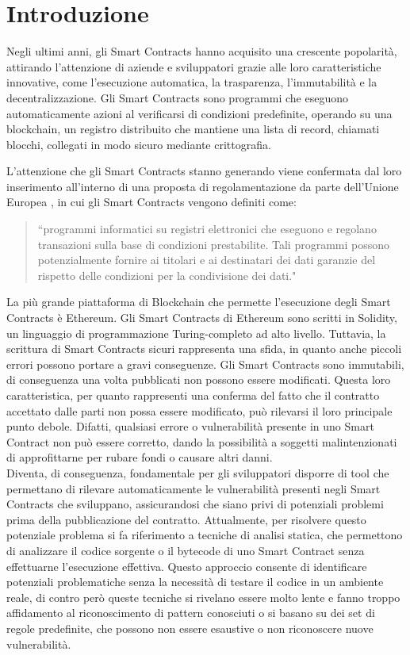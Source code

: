 \documentclass[../../Thesis.tex]{subfiles}
\begin{document}
\chapter{Introduzione}
Negli ultimi anni, gli Smart Contracts hanno acquisito una crescente popolarit\`a, attirando l'attenzione di aziende e sviluppatori grazie alle loro caratteristiche innovative, come l'esecuzione automatica, la trasparenza, l'immutabilit\`a e la decentralizzazione. Gli Smart Contracts sono programmi che eseguono automaticamente azioni al verificarsi di condizioni predefinite, operando su una blockchain, un registro distribuito che mantiene una lista di record, chiamati blocchi, collegati in modo sicuro mediante crittografia.

L'attenzione che gli Smart Contracts stanno generando viene confermata dal loro inserimento all'interno di una proposta di regolamentazione da parte dell'Unione Europea \cite{DataAct}, in cui gli Smart Contracts vengono definiti come: 
\begin{quotation}
    ``programmi informatici su registri elettronici che eseguono e regolano transazioni sulla base di condizioni prestabilite. Tali programmi possono potenzialmente fornire ai titolari e ai destinatari dei dati garanzie del rispetto delle condizioni per la condivisione dei dati."
\end{quotation}


La pi\`u grande piattaforma di Blockchain che permette l'esecuzione degli Smart Contracts \`e Ethereum. Gli Smart Contracts di Ethereum sono scritti in Solidity, un linguaggio di programmazione Turing-completo ad alto livello. Tuttavia, la scrittura di Smart Contracts sicuri rappresenta una sfida, in quanto anche piccoli errori possono portare a gravi conseguenze. Gli Smart Contracts sono immutabili, di conseguenza una volta pubblicati non possono essere modificati. Questa loro caratteristica, per quanto rappresenti una conferma del fatto che il contratto accettato dalle parti non possa essere modificato, pu\`o rilevarsi il loro principale punto debole. Difatti, qualsiasi errore o vulnerabilit\`a presente in uno Smart Contract non pu\`o essere corretto, dando la possibilit\`a a soggetti malintenzionati di approfittarne per rubare fondi o causare altri danni.\\

Diventa, di conseguenza, fondamentale per gli sviluppatori disporre di tool che permettano di rilevare automaticamente le vulnerabilit\`a presenti negli Smart Contracts che sviluppano, assicurandosi che siano privi di potenziali problemi prima della pubblicazione del contratto. Attualmente, per risolvere questo potenziale problema si fa riferimento a tecniche di analisi statica, che permettono di analizzare il codice sorgente o il bytecode di uno Smart Contract senza effettuarne l'esecuzione effettiva. Questo approccio consente di identificare potenziali problematiche senza la necessit\`a di testare il codice in un ambiente reale, di contro per\`o queste tecniche si rivelano essere molto lente e fanno troppo affidamento al riconoscimento di pattern conosciuti o si basano su dei set di regole predefinite, che possono non essere esaustive o non riconoscere nuove vulnerabilit\`a. 
\end{document}
